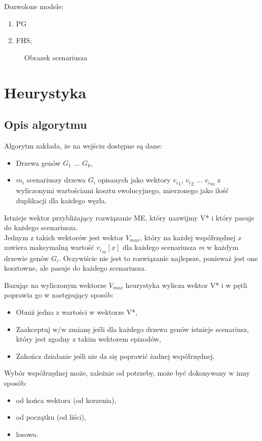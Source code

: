 \documentclass[licencjacka]{pracamgr}
\begin{document}
Dozwolone modele:
\begin{enumerate}
\item PG\\[1in]
\item FHS;\\[1in]
\end{enumerate}

\begin{figure}[tp]
  \centering
  \caption{Obrazek scenariusza}
\end{figure}

\chapter{Heurystyka}\label{r:heurystyka}

\section{Opis algorytmu}

Algorytm zakłada, że na wejściu dostępne są dane:
\begin{itemize}
\item Drzewa genów $G_1$ ... $G_k$,
\item $m_i$ scenariuszy drzewa $G_i$ opisanych jako wektory ${v_i}_1$, ${v_i}_2$ ... ${v_i}_m$ z wyliczonymi wartościami kosztu ewolucyjnego, mierzonego jako ilość duplikacji dla każdego węzła.
\end{itemize}
Istnieje wektor przybliżający rozwiązanie ME, który nazwijmy V* i który pasuje do każdego scenariusza. \\
Jednym z takich wektorów jest wektor $V_{max}$, który na każdej współrzędnej \textit{x} zawiera maksymalną wartość ${{v_i}_m}[x]$ dla każdego scenariusza \textit{m} w każdym drzewie genów $G_i$. Oczywiście nie jest to rozwiązanie najlepsze, ponieważ jest one kosztowne, ale pasuje do każdego scenariusza.

Bazując na wyliczonym wektorze $V_{max}$ heurystyka wylicza wektor V* i w pętli poprawia go w następujący sposób:
\begin{itemize}
\item Obniż jedna z wartości w wektorze V*,
\item Zaakceptuj w/w zmianę jeśli dla każdego drzewa genów istnieje scenariusz, który jest zgodny z takim wektorem epizodów,
\item Zakończ działanie jeśli nie da się poprawić żadnej współrzędnej.
\end{itemize}
Wybór współrzędnej może, zależnie od potrzeby, może być dokonywany w inny sposób:
\begin{itemize}
\item od końca wektora (od korzenia),
\item od początku (od liści),
\item losowo.
\end{itemize}
\end{document}
